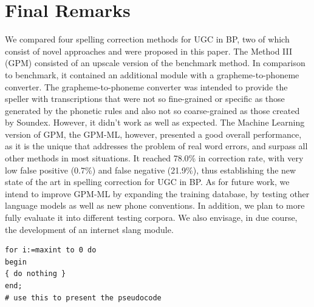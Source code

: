 \section{Final Remarks}\label{sec:final-remarks}

We compared four spelling correction methods for UGC in BP, two of which consist of novel approaches and were proposed in this paper. The Method III (GPM) consisted of an upscale version of the benchmark method. In comparison to benchmark, it contained an additional module with a grapheme-to-phoneme converter. The grapheme-to-phoneme converter was intended to provide the speller with transcriptions that were not so fine-grained or specific as those generated by the phonetic rules and also not so coarse-grained as those created by Soundex. However, it didn't work as well as expected.  The Machine Learning version of GPM, the GPM-ML, however, presented a good overall performance, as it is the unique that addresses the problem of real word errors, and surpass all other methods in most situations.  It reached 78.0\% in correction rate, with very low false positive (0.7\%) and false negative (21.9\%), thus establishing the new state of the art in spelling correction for UGC in BP. As for future work, we intend to improve GPM-ML by expanding the training database, by testing other language models as well as new phone conventions. In addition, we plan to more fully evaluate it into different testing corpora. We also envisage, in due course, the development of an internet slang module.

\begin{lstlisting}[float,caption=A floating example]
for i:=maxint to 0 do
begin
{ do nothing }
end;
# use this to present the pseudocode
\end{lstlisting}


